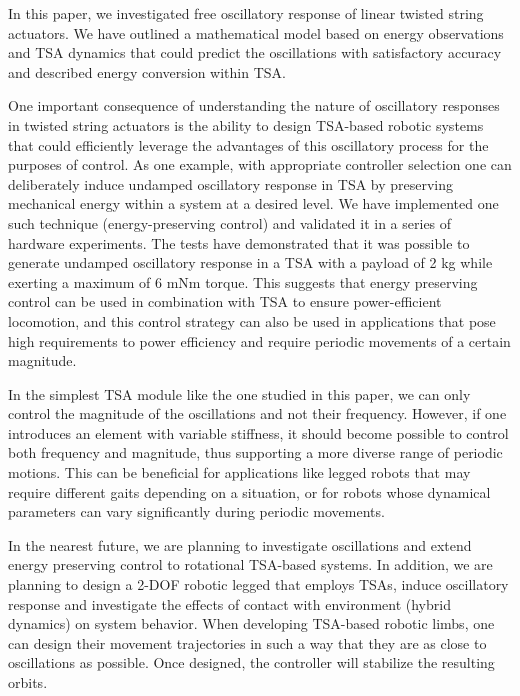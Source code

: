 In this paper, we investigated free oscillatory response of linear twisted string actuators. We have outlined a mathematical model based on energy observations and TSA dynamics that could predict the oscillations with satisfactory accuracy and described energy conversion within TSA. 

One important consequence of understanding the nature of oscillatory responses in twisted string actuators is the ability to design TSA-based robotic systems that could efficiently leverage the advantages of this oscillatory process for the purposes of control. As one example, with appropriate controller selection one can deliberately induce undamped oscillatory response in TSA by preserving mechanical energy within a system at a desired level. We have implemented one such technique (energy-preserving control) and validated it in a series of hardware experiments. The tests have demonstrated that it was possible to generate undamped oscillatory response in a TSA with a payload of 2 kg while exerting a maximum of 6 mNm torque. This suggests that energy preserving control can be used in combination with TSA to ensure power-efficient locomotion, and this control strategy can also be used in applications that pose high requirements to power efficiency and require periodic movements of a certain magnitude.

In the simplest TSA module like the one studied in this paper, we can only control the magnitude of the oscillations and not their frequency. However, if one introduces an element with variable stiffness, it should become possible to control both frequency and magnitude, thus supporting a more diverse range of periodic motions. This can be beneficial for applications like legged robots that may require different gaits depending on a situation, or for robots whose dynamical parameters can vary significantly during periodic movements.

In the nearest future, we are planning to investigate oscillations and extend energy preserving control to rotational TSA-based systems. In addition, we are planning to design a 2-DOF robotic legged that employs TSAs, induce oscillatory response and investigate the effects of contact with environment (hybrid dynamics) on system behavior. When developing TSA-based robotic limbs, one can design their movement trajectories in such a way that they are as close to oscillations as possible. Once designed, the controller will stabilize the resulting orbits.
